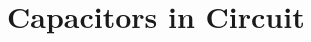\documentclass[12pt,aspectratio=169]{beamer}
\begin{document}
%   
%



\section{Capacitors in Circuit}
\end{document}
